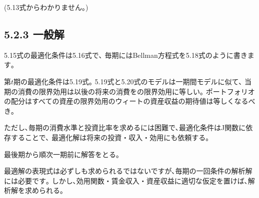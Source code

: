 \documentclass[uplatex,a4paper]{jsarticle}
\begin{document}
(5.13式からわかりません｡)
\subsection*{5.2.3 一般解}
5.15式の最適化条件は5.16式で､
毎期にはBellman方程式を5.18式のように書きます｡

第$t$期の最適化条件は5.19式｡
5.19式と5.20式のモデルは一期間モデルに似て､
当期の消費の限界効用は以後の将来の消費をの限界効用に等しい｡
ポートフォリオの配分はすべての資産の限界効用のウィートの資産収益の期待値は等しくなるべき｡

ただし､毎期の消費水準と投資比率を求めるには困難で､最適化条件はJ関数に依存することで､
最適化解は将来の投資・収入・効用にも依頼する｡

最後期から順次一期前に解答をとる｡

最適解の表現式は必ずしも求められるではないですが､毎期の一回条件の解析解には必要です｡
しかし､効用関数・賃金収入・資産収益に適切な仮定を置けば､解析解を求められる｡
\end{document}
